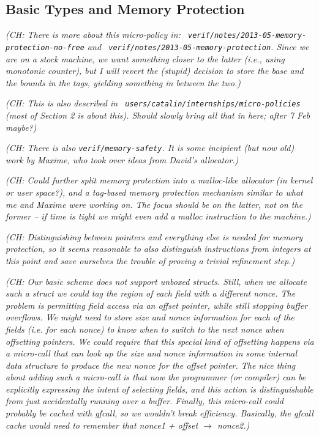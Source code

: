 \documentclass{article}
\newcommand{\ch}[1]{{\color{dkblue}\em (CH: #1)}}
\newcommand*{\IE}{i.e.,\xspace}
\begin{document}
\subsection{Basic Types and Memory Protection}

\sloppy

\ch{There is more about this micro-policy in: {\tt
    verif/notes/2013-05-memory-protection-no-free} and {\tt
    verif/notes/2013-05-memory-protection}. Since we are on a stock
  machine, we want something closer to the latter (\IE using monotonic
  counter), but I will revert the (stupid) decision to store the base
  and the bounds in the tags, yielding something in between the two.}

\ch{This is also described in {\tt
    users/catalin/internships/micro-policies} (most of Section 2 is
  about this).  Should slowly bring all that in here; after 7 Feb
  maybe?}

\ch{There is also {\tt verif/memory-safety}. It is some incipient (but
  now old) work by Maxime, who took over ideas from David's
  allocator.}
\
\fussy

\ch{Could further split memory protection into a malloc-like allocator
  (in kernel or user space?), and a tag-based memory protection
  mechanism similar to what me and Maxime were working on. The focus
  should be on the latter, not on the former -- if time is tight we
  might even add a malloc instruction to the machine.}

\ch{Distinguishing between pointers and everything else is needed for
  memory protection, so it seems reasonable to also distinguish
  instructions from integers at this point and save ourselves the
  trouble of proving a trivial refinement step.}

\ch{Our basic scheme does not support unboxed structs.  Still, when we
  allocate such a struct we could tag the region of each field with a
  different nonce. The problem is permitting field access via an
  offset pointer, while still stopping buffer overflows. We might need
  to store size and nonce information for each of the fields (i.e. for
  each nonce) to know when to switch to the next nonce when offsetting
  pointers.  We could require that this special kind of offsetting
  happens via a micro-call that can look up the size and nonce
  information in some internal data structure to produce the new nonce
  for the offset pointer. The nice thing about adding such a
  micro-call is that now the programmer (or compiler) can be
  explicitly expressing the intent of selecting fields, and this
  action is distinguishable from just accidentally running over a
  buffer. Finally, this micro-call could probably be cached with
  gfcall, so we wouldn't break efficiency. Basically, the gfcall cache
  would need to remember that nonce1 + offset $\to$ nonce2.}
\end{document}
